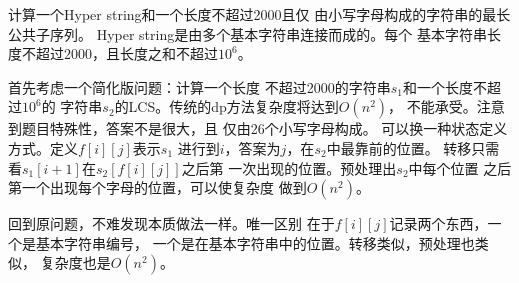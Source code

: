 \begin{prob}
	计算一个Hyper string和一个长度不超过2000且仅
	由小写字母构成的字符串的最长公共子序列。
	Hyper string是由多个基本字符串连接而成的。每个
	基本字符串长度不超过$2000$，且长度之和不超过$10^6$。
\end{prob}

\begin{sol}
	首先考虑一个简化版问题：计算一个长度
	不超过2000的字符串$s_1$和一个长度不超过$10^6$的
	字符串$s_2$的LCS。传统的dp方法复杂度将达到$O(n^2)$，
	不能承受。注意到题目特殊性，答案不是很大，且
	仅由26个小写字母构成。
	可以换一种状态定义方式。定义$f[i][j]$表示$s_1$
	进行到$i$，答案为$j$，在$s_2$中最靠前的位置。
	转移只需看$s_1[i+1]$在$s_2[f[i][j]]$之后第
	一次出现的位置。预处理出$s_2$中每个位置
	之后第一个出现每个字母的位置，可以使复杂度
	做到$O(n^2)$。\par
	回到原问题，不难发现本质做法一样。唯一区别
	在于$f[i][j]$记录两个东西，一个是基本字符串编号，
	一个是在基本字符串中的位置。转移类似，预处理也类似，
	复杂度也是$O(n^2)$。
\end{sol}
